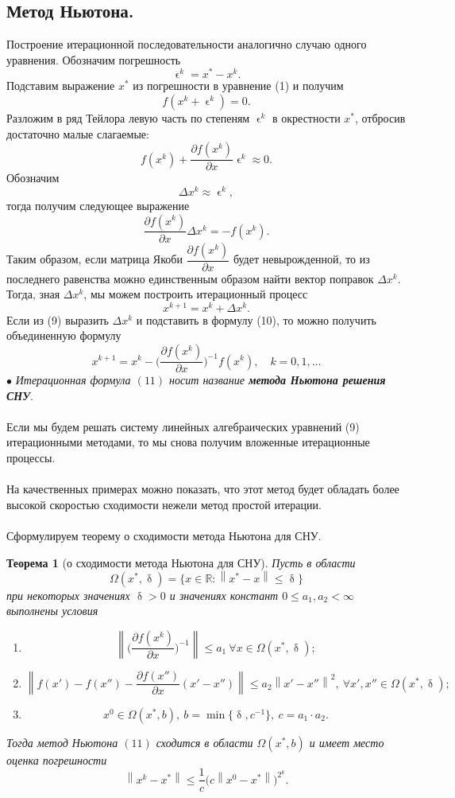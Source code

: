 \documentclass[a4paper, 12pt]{report}
\numberwithin{equation}{section}
\newcommand{\Rm}{\mathbb{R}}
\renewcommand{\leq}{\leqslant}
\renewcommand{\delta}{\updelta}
\renewcommand{\varepsilon}{\upvarepsilon}
\newcommand\Norm[1]{\left\| #1 \right\|}
\newtheorem*{theorem}{Теорема}
\begin{document}
\subsection{Метод Ньютона.}
Построение итерационной последовательности аналогично случаю одного уравнения. Обозначим погрешность $$\varepsilon^k = x^* - x^k.$$
Подставим выражение $x^*$ из погрешности в уравнение (1) и получим $$f(x^k + \varepsilon^k) = 0.$$
Разложим в ряд Тейлора левую часть по степеням $\varepsilon^k$ в окрестности $x^*$, отбросив достаточно малые слагаемые:
$$f(x^k) + \dfrac{\partial f(x^k)}{\partial x} \varepsilon^k\approx 0.$$
Обозначим $$\Delta x^k \approx \varepsilon^k,$$ тогда получим следующее выражение 
\begin{equation}
	\dfrac{\partial f(x^k)}{\partial x}\Delta x^k = -f(x^k).
\end{equation}
Таким образом, если матрица Якоби $\dfrac{\partial f(x^k)}{\partial x}$ будет невырожденной, то из последнего равенства можно единственным образом найти вектор поправок $\Delta x^k$. Тогда, зная $\Delta x^k$, мы можем построить итерационный процесс 
\begin{equation}
	x^{k+1} = x^k + \Delta x^k.
\end{equation}
Если из (9) выразить $\Delta x^k$ и подставить в формулу (10), то можно получить объединенную формулу 
\begin{equation}
	x^{k+1} = x^k - \Big(\dfrac{\partial f(x^k)}{\partial x}\Big)^{-1}f(x^k),\quad k=0,1,\ldots
\end{equation}
$\bullet$ \textit{Итерационная формула $(11)$ носит название \textbf{метода Ньютона решения СНУ}}.
\\\\
Если мы будем решать систему линейных алгебраических уравнений (9) итерационными методами, то мы снова получим вложенные итерационные процессы.\\\\
На качественных примерах можно показать, что этот метод будет обладать более высокой скоростью сходимости нежели метод простой итерации.\\\\
Сформулируем теорему о сходимости метода Ньютона для СНУ.
\begin{theorem}
	[о сходимости метода Ньютона для СНУ]
	Пусть в области $$\Omega(x^*, \delta) = \{x\in \Rm: \Norm{x^* - x}\leq \delta\}$$ при некоторых значениях $\delta>0$ и значениях констант $0\leq a_1, a_2<\infty$ выполнены условия \begin{enumerate}
		\item $$\Norm{\Big(\dfrac{\partial f(x^k)}{\partial x}\Big)^{-1}}\leq a_1\ \forall x \in \Omega(x^*, \delta);$$
		\item $$\Norm{f(x') - f(x'') - \dfrac{\partial f(x'')}{\partial x}(x'-x'')}\leq a_2\Norm{x' -x''}^2,\ \forall x', x'' \in \Omega(x^*, \delta);$$
		\item $$x^0 \in \Omega(x^*, b),\ b = \min\{\delta, c^{-1}\},\ c = a_1\cdot a_2.$$
	\end{enumerate}
	Тогда метод Ньютона $(11)$ сходится в области $\Omega(x^*, b)$ и имеет место оценка погрешности $$\Norm{x^k - x^*}\leq \dfrac{1}{c}\Big(c \Norm{x^0 - x^*}\Big)^{2^k}.$$
\end{theorem}
\end{document}

